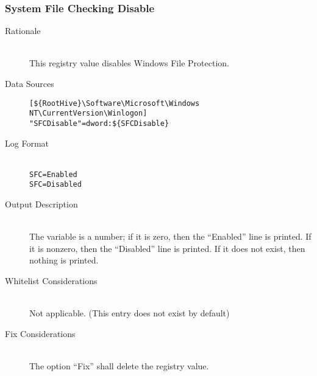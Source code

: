 \subsubsection{System File Checking Disable}
\begin{description}
\item[Rationale] \hfill \\
This registry value disables Windows File Protection.
\item[Data Sources] \hfill
\vspace{-\baselineskip}
\begin{verbatim}
[${RootHive}\Software\Microsoft\Windows NT\CurrentVersion\Winlogon]
"SFCDisable"=dword:${SFCDisable}
\end{verbatim}
\item[Log Format] \hfill \\
\verb|SFC=Enabled| \\
\verb|SFC=Disabled|
\item[Output Description] \hfill \\
The variable  is a number; if it is zero, then the ``Enabled''
line is printed. If it is nonzero, then the ``Disabled'' line is printed. If it
does not exist, then nothing is printed.
\item[Whitelist Considerations] \hfill \\
Not applicable. (This entry does not exist by default)
\item[Fix Considerations] \hfill \\
The option ``Fix'' shall delete the registry value.
\end{description}

